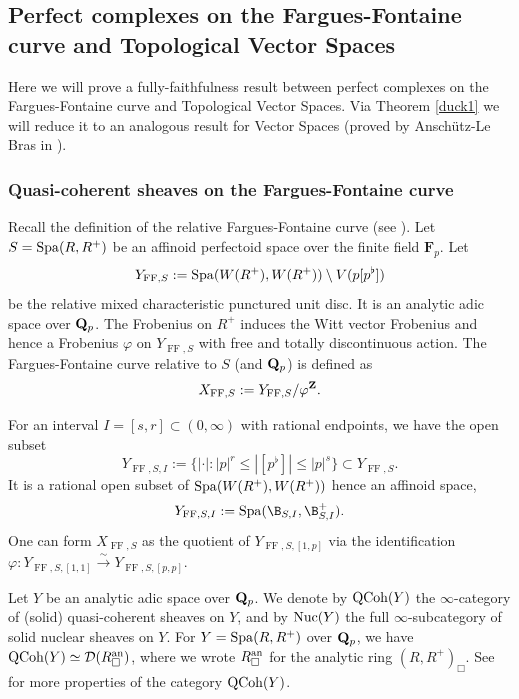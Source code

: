 \documentclass[10pt]{amsart}
\theoremstyle{definition}
\theoremstyle{remark}
\def\phi{\varphi}
\newcommand{\FF}{\operatorname{FF} }
\newcommand{\so}{{\mathcal O}}
\newcommand{\sd}{{\mathcal{D}}}
\numberwithin{equation}{section}
\def\Q{{\bf Q}} \def\Z{{\bf Z}}
\numberwithin{equation}{section}
\begin{document}
\subsection{Perfect complexes on the Fargues-Fontaine curve and Topological Vector Spaces}
Here we will prove a fully-faithfulness result between perfect complexes on the Fargues-Fontaine curve and Topological Vector Spaces. Via Theorem \ref{duck1} we will reduce it to an analogous result for Vector Spaces (proved by Ansch\"utz-Le Bras in \cite{AnLB}).
\subsubsection{Quasi-coherent sheaves on the Fargues-Fontaine curve}
Recall the definition of the relative Fargues-Fontaine curve (see \cite[Lecture 12]{SW}). Let  $S = {\rm Spa}(R,R^+)$ be an affinoid perfectoid space over the finite field ${\mathbf F}_p$.  Let
$$Y_{\FF,S} := {\rm Spa}(W(R^+),W(R^+)) \setminus V (p[p^{\flat}])
 $$
 be the relative mixed characteristic punctured unit disc. 
It is an analytic adic space over $\Q_p$. The
Frobenius on $R^+$ induces the Witt vector Frobenius and hence  a Frobenius  $\phi$ on $Y_{\FF,S}$ with  free and
totally discontinuous action. The Fargues-Fontaine curve relative to $S$
(and $\Q_p$) is defined as 
$$X_{\FF,S} := Y_{\FF,S}/\phi^{\Z}.
 $$
 
   For an interval $I = [s, r]\subset  (0,\infty)$ with rational endpoints, we have the open subset
$$Y_{\FF,S,I} := \{|\cdot|: |p|^r \leq |[p^{\flat}]| \leq  |p|^s\} \subset  Y_{\FF,S}. 
 $$
  It is a rational open subset of ${\rm Spa}(W(R^+),W(R^+))$ hence 
an affinoid space,
$$
Y_{\FF,S,I}:={\rm Spa}(\B_{S,I},\B^+_{S,I}).
$$ One can form $X_{\FF,S}$ as the quotient of $Y_{\FF,S,[1,p]}$ via the identification $\phi: Y_{\FF,S,[1,1]}\stackrel{\sim}{\to} Y_{\FF,S,[p,p]}$. 
           
Let  $Y$ be an analytic adic space over $\Q_p$. We denote by ${\rm QCoh}(Y )$ the $\infty$-category of (solid) quasi-coherent sheaves
on $Y$, and by  ${\rm Nuc}(Y )$ the full $\infty$-subcategory of solid nuclear sheaves on $Y$. For $Y={\rm Spa}(R,R^+)$ over $\Q_p$, we have ${\rm QCoh}(Y )\simeq 
\sd(R^{\rm an}_{\Box})$, where we wrote  $R^{\rm an}_{\Box}$ for the analytic ring $(R,R^+)_{\Box}$.
  See \cite{And21}  for more properties of the category ${\rm QCoh}(Y )$.
\end{document}
